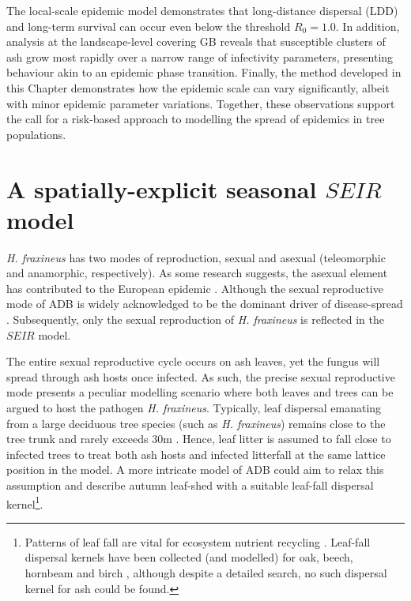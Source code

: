 The local-scale epidemic model demonstrates that long-distance dispersal (LDD) and long-term survival 
can occur even below the threshold $R_0=1.0$. In addition, analysis at the landscape-level covering GB reveals 
that susceptible clusters of ash grow most rapidly over a narrow range of infectivity parameters, 
presenting behaviour akin to an epidemic phase transition. Finally, the method developed in this Chapter demonstrates how the epidemic scale can vary significantly, 
albeit with minor epidemic parameter variations. Together, these observations support the call for a risk-based approach to modelling the spread of epidemics in tree populations.

\section{A spatially-explicit seasonal $SEIR$ model}
\label{sec:seir-model}

\textit{H. fraxineus} has two modes of reproduction, sexual and asexual (teleomorphic and anamorphic, respectively).
As some research suggests, the asexual element has contributed to the European epidemic \cite{fones2016role}. 
Although the sexual reproductive mode of ADB is widely acknowledged to be the dominant driver of disease-spread 
\cite{https://doi.org/10.1111/ppa.12844, havnavckova2017direct, gross2012reproductive, Timmermann2011elal}.
Subsequently, only the sexual reproduction of \textit{H. fraxineus} is reflected in the $SEIR$ model.

The entire sexual reproductive cycle occurs on ash leaves, yet the fungus will spread through ash hosts once infected. 
As such, the precise sexual reproductive mode presents a peculiar modelling scenario where both leaves and trees can be argued
to host the pathogen \textit{H. fraxineus}. 
Typically, leaf dispersal emanating from a large deciduous tree species (such as \textit{H. fraxineus}) remains close
to the tree trunk and rarely exceeds $30\mathrm{m}$ \cite{nickmans2019modelling}. Hence, leaf litter is assumed to fall close
to infected trees to treat both ash hosts and infected litterfall at the same lattice position in the model. 
A more intricate model of ADB could aim to relax this assumption and describe autumn leaf-shed with a suitable leaf-fall dispersal kernel\footnote{
    Patterns of leaf fall are vital for ecosystem nutrient recycling \cite{staelens2003model}. 
    Leaf-fall dispersal kernels have been collected (and modelled) for oak, beech, hornbeam and birch \cite{nickmans2019modelling},
    although despite a detailed search, no such dispersal kernel for ash could be found.
}.

